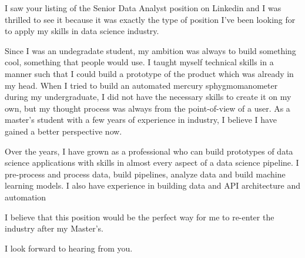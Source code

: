 I saw your listing of the Senior Data Analyst position on Linkedin and I was thrilled to see it because it was exactly the type of position I've been looking for to apply my skills in data science industry.

Since I was an undegradate student, my ambition was always to build something cool, something that people would use. I taught myself technical skills in a manner such that I could build a prototype of the product which was already in my head. When I tried to build an automated mercury sphygmomanometer during my undergraduate, I did not have the necessary skills to create it on my own, but my thought process was always from the point-of-view of a user. As a master's student with a few years of experience in industry, I believe I have gained a better perspective now.

Over the years, I have grown as a professional who can build prototypes of data science applications with skills in almost every aspect of a data science pipeline. I pre-process and process data, build pipelines, analyze data and build machine learning models. I also have experience in building data and API architecture and automation

I believe that this position would be the perfect way for me to re-enter the industry after my Master's. 

I look forward to hearing from you.